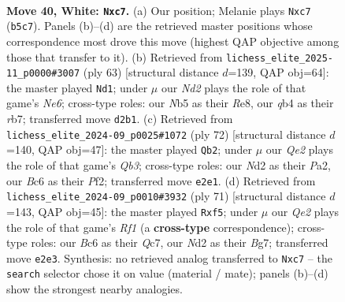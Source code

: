 \documentclass[11pt]{article}
\begin{document}
\begin{figure}[p]
\label{fig:thought-m76}
\end{figure}

\clearpage

\begin{figure}[p]\centering
\begin{subfigure}{0.46\textwidth}\centering
\resizebox{\linewidth}{!}{%
\newchessgame
\chessboard[
  setfen={1rb2r2/p1n2p1k/1pB2Bp1/1N1p4/1q5P/1P4p1/R1PNQP2/R5K1 w - - 2 40},
  showmover=false,
  pgfstyle=straightmove, color=movearrow, markmove={b5-c7}
]}
\caption{}
\end{subfigure}\hfill
\begin{subfigure}{0.46\textwidth}\centering
\resizebox{\linewidth}{!}{%
\newchessgame
\chessboard[
  setfen={4rrk1/pR3pp1/Bb1q4/1Q1p1PB1/3P2P1/2P1nK1P/P4R2/8 b - - 8 32},
  showmover=false,
  pgfstyle=straightmove, color=movearrow, markmove={e3-d1}
]}
\caption{}
\end{subfigure}
\\[4pt]
\begin{subfigure}{0.46\textwidth}\centering
\resizebox{\linewidth}{!}{%
\newchessgame
\chessboard[
  setfen={4r2k/pp3rp1/2b4p/2qN1p2/2PRn2P/1Q4PB/P4P2/3R2K1 w - - 21 37},
  showmover=false,
  pgfstyle=straightmove, color=movearrow, markmove={b3-b2}
]}
\caption{}
\end{subfigure}\hfill
\begin{subfigure}{0.46\textwidth}\centering
\resizebox{\linewidth}{!}{%
\newchessgame
\chessboard[
  setfen={1r3r2/2q3bk/2P4p/p3pN2/4Pn2/P4Pp1/3QB1Pp/R4R1K b - - 7 36},
  showmover=false,
  pgfstyle=straightmove, color=movearrow, markmove={f8-f5}
]}
\caption{}
\end{subfigure}
\caption{\textbf{Move 40, White: \texttt{Nxc7}.} (a) Our position; Melanie plays \texttt{Nxc7} (\texttt{b5c7}). Panels (b)--(d) are the retrieved master positions whose correspondence most drove this move (highest QAP objective among those that transfer to it). (b) Retrieved from \texttt{lichess\_elite\_2025-11\_p0000\#3007} (ply 63) [structural distance $d$=139, QAP obj=64]: the master played \texttt{Nd1}; under $\mu$ our \emph{Nd2} plays the role of that game's \emph{Ne6}; cross-type roles: our \emph{N}b5 as their \emph{R}e8, our \emph{q}b4 as their \emph{r}b7; transferred move \texttt{d2b1}. (c) Retrieved from \texttt{lichess\_elite\_2024-09\_p0025\#1072} (ply 72) [structural distance $d$=140, QAP obj=47]: the master played \texttt{Qb2}; under $\mu$ our \emph{Qe2} plays the role of that game's \emph{Qb3}; cross-type roles: our \emph{N}d2 as their \emph{P}a2, our \emph{B}c6 as their \emph{P}f2; transferred move \texttt{e2e1}. (d) Retrieved from \texttt{lichess\_elite\_2024-09\_p0010\#3932} (ply 71) [structural distance $d$=143, QAP obj=45]: the master played \texttt{Rxf5}; under $\mu$ our \emph{Qe2} plays the role of that game's \emph{Rf1} (a \textbf{cross-type} correspondence); cross-type roles: our \emph{B}c6 as their \emph{Q}c7, our \emph{N}d2 as their \emph{B}g7; transferred move \texttt{e2e3}. Synthesis: no retrieved analog transferred to \texttt{Nxc7} -- the \texttt{search} selector chose it on value (material / mate); panels (b)--(d) show the strongest nearby analogies.}
\label{fig:thought-m78}
\end{figure}
\end{document}
